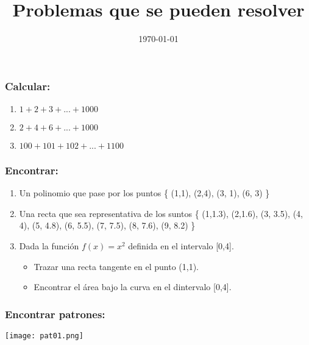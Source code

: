 \documentclass{beamer}
\title[lgs@unam.mx]{Problemas que se pueden resolver}
\date{\today}
\begin{document}
\frame{\titlepage}

\begin{frame}
    \frametitle{Calcular:}
    
    \begin{enumerate}
    \item $1 + 2 + 3 + ... + 1000$
    \vspace{5mm}
    \item $2 + 4 + 6 + ... + 1000$
    \vspace{5mm}
    \item $100 + 101 + 102 + ... + 1100$
    
    
    \end{enumerate}
    
\end{frame}

\begin{frame}
    \frametitle{Encontrar:}
    
    \begin{enumerate}
    \item Un polinomio que pase por los puntos \{ (1,1), (2,4), (3, 1), (6, 3) \}
    \vspace{5mm}
    \item Una recta que sea representativa de los suntos \{ (1,1.3), (2,1.6), (3, 3.5), (4, 4), (5, 4.8), (6, 5.5), (7, 7.5), 
(8, 7.6), (9, 8.2) \}
    \vspace{5mm}
    \item Dada la función $f(x)=x^2$ definida en el intervalo [0,4]. 
    
    \renewcommand{\labelenumii}{\Roman{enumii}}
    \begin{itemize}
    \item Trazar una recta tangente en el punto (1,1).
    \vspace{5mm}
    \item Encontrar el área bajo la curva en el dintervalo [0,4].   
    \end{itemize}
    
    
    \end{enumerate}
    
\end{frame}

\begin{frame}
    \frametitle{Encontrar patrones:}
    
\texttt{[image: pat01.png]}


\end{frame}
    
\end{document}

